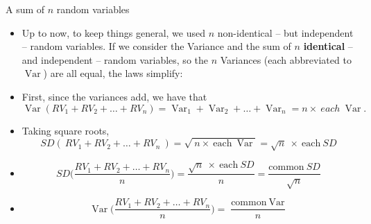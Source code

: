 \documentclass[10pt]{beamer}\usepackage[]{graphicx}\usepackage[]{color}
\newcommand{\Var}{\operatorname{Var}}
\begin{document}
\begin{frame}[fragile]{A sum of $n$ random variables}
	
	\begin{itemize}
		\setlength{\itemsep}{10pt}		
		\item Up to now, to keep things general, we used $n$ non-identical -- but independent -- random variables. If we
		consider the Variance and the sum of $n$ \textbf{identical} -- and independent -- random variables, so the $n$ Variances (each abbreviated to $\Var$) are all equal, the laws simplify:
		
		\item First, since the variances add, we have that	
		$$ \Var(RV_1 + RV_2 + \dots + RV_n) = \Var_1 + \Var_2 + \dots + \Var_n = n \times \ each \ \Var.$$
		
		\item Taking square roots,	
		$$ SD( \ RV_1 + RV_2 + \dots + RV_n \ ) = \sqrt{ \ n \times \ \textrm{each} \ \Var} = \sqrt{n} \ \times \ \textrm{each} \ SD$$
		
		
		\item $$ SD\bigg(\frac{RV_1 + RV_2 + \dots + RV_n}{n}\bigg) = \frac{\sqrt{n} \ \times \ \textrm{each} \ SD}{n} = \frac{\textrm{common} \ SD}{\sqrt{n}} $$
		
		\item $$ \Var\bigg(\frac{RV_1 + RV_2 + \dots + RV_n}{n}\bigg) = \frac{\textrm{common} \ \Var}{n} $$
		
		
		
	\end{itemize}
	
\end{frame}
\end{document}
